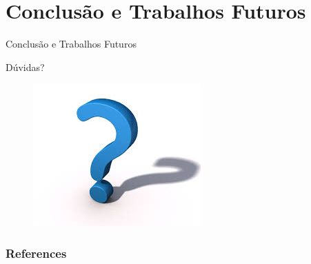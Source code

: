 \documentclass[t,14pt,mathserif]{beamer}
\begin{document}
\section{Conclusão e Trabalhos Futuros}

\begin{frame}{Conclusão e Trabalhos Futuros}

\end{frame}

\begin{frame}{Dúvidas?}
	\begin{figure}[hbtp]
		\centering
	    \includegraphics[scale=1]{../img/questions.jpg}
	\end{figure}
\end{frame}

\begin{frame}[allowframebreaks]
   \frametitle{References}
   
   
\end{frame}
\end{document}
